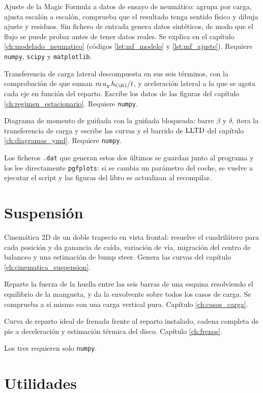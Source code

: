 \begin{description}[leftmargin=0pt,labelsep=0pt,style=nextline]
  \item[\texttt{dinamica/ajuste\_mf.py}] Ajuste de la Magic Formula a datos de
    ensayo de neumático: agrupa por carga, ajusta escalón a escalón, comprueba
    que el resultado tenga sentido físico y dibuja ajuste y residuos. Sin
    fichero de entrada genera datos sintéticos, de modo que el flujo se puede
    probar antes de tener datos reales. Se explica en el capítulo
    \ref{ch:modelado_neumatico} (códigos \ref{lst:mf_modelo} y
    \ref{lst:mf_ajuste}). Requiere \texttt{numpy}, \texttt{scipy} y
    \texttt{matplotlib}.
  \item[\texttt{dinamica/balance\_estacionario.py}] Transferencia de carga
    lateral descompuesta en sus seis términos, con la comprobación de que suman
    $m\,a_y\,h_{\mathrm{CdG}}/t$, y aceleración lateral a la que se agota cada eje en
    función del reparto. Escribe los datos de las figuras del capítulo
    \ref{ch:regimen_estacionario}. Requiere \texttt{numpy}.
  \item[\texttt{dinamica/ymd.py}] Diagrama de momento de guiñada con la guiñada
    bloqueada: barre $\beta$ y $\delta$, itera la transferencia de carga y
    escribe las curvas y el barrido de $\mathrm{LLTD}$ del capítulo
    \ref{ch:diagramas_ymd}. Requiere \texttt{numpy}.
\end{description}

Los ficheros \texttt{.dat} que generan estos dos últimos se guardan junto al
programa y los lee directamente \texttt{pgfplots}: si se cambia un parámetro del
coche, se vuelve a ejecutar el script y las figuras del libro se actualizan al
recompilar.


\section{Suspensión}
\label{sec:codigo_suspension}

\begin{description}[leftmargin=0pt,labelsep=0pt,style=nextline]
  \item[\texttt{suspension/cinematica.py}] Cinemática 2D de un doble trapecio en
    vista frontal: resuelve el cuadrilátero para cada posición y da ganancia de
    caída, variación de vía, migración del centro de balanceo y una estimación
    de bump steer. Genera las curvas del capítulo
    \ref{ch:cinematica_suspension}.
  \item[\texttt{suspension/cargas\_esquina.py}] Reparte la fuerza de la huella
    entre las seis barras de una esquina resolviendo el equilibrio de la
    mangueta, y da la envolvente sobre todos los casos de carga. Se comprueba a
    sí mismo con una carga vertical pura. Capítulo \ref{ch:casos_carga}.
  \item[\texttt{suspension/frenos.py}] Curva de reparto ideal de frenada frente
    al reparto instalado, cadena completa de pie a deceleración y estimación
    térmica del disco. Capítulo \ref{ch:frenos}.
\end{description}

Los tres requieren solo \texttt{numpy}.

\section{Utilidades}
\label{sec:codigo_utilidades}

